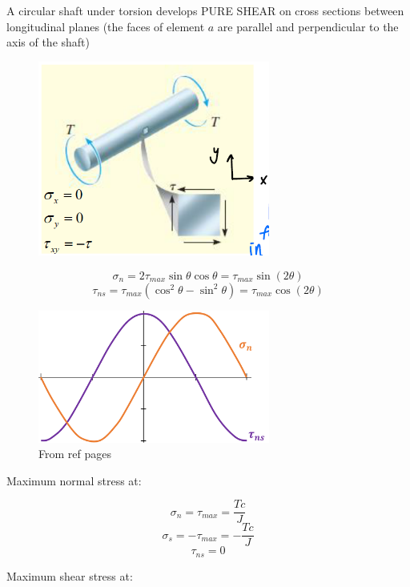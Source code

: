 \noindent A circular shaft under torsion develops PURE SHEAR on cross sections between longitudinal planes (the faces of element $a$ are parallel and perpendicular to the axis of the shaft) \begin{figure}[!h]
\centering
\includegraphics[angle=0, width=3in]{Stress Transformation-Figures/Circular Shaft Torsion.png}
\vspace{-2mm}
\caption{\small {}}
\vspace{-3mm}
\label{Fig:MaxNormal}
\end{figure}

\[\sigma_n = 2\tau_{max} \sin\theta \cos\theta = \tau_{max} \sin (2\theta)\] 
\[\tau_{ns} = \tau_{max}(\cos^2\theta - \sin^2\theta) = \tau_{max} \cos(2\theta)\]

\begin{figure}[!h]
\centering
\includegraphics[angle=0, width=3in]{Stress Transformation-Figures/normalShearStressRelation.png}
\vspace{-2mm}
\caption{\small From ref pages}
\vspace{-3mm}
\label{Fig:StressRelation}
\end{figure}

\noindent Maximum normal stress at:

\[\sigma_n = \tau_{max} = \frac{Tc}{J}\] 
\[\sigma_s = -\tau_{max} = -\frac{Tc}{J}\] 
\[\tau_{ns} = 0\]

\noindent Maximum shear stress at:

